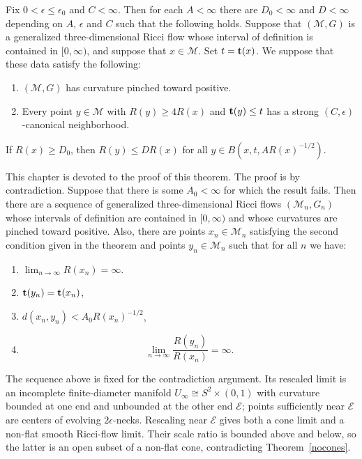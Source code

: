 \begin{theorem}
\label{thm:bounded-curvature-bounded-distance}
\label{bcbd}
Fix $0<\epsilon\le \epsilon_0$ and  $C<\infty$. Then for each
$A<\infty$ there are $D_0<\infty$ and $D<\infty$ depending on $A$,
$\epsilon$ and $C$ such that the following holds. Suppose that
$({\mathcal M},G)$ is a generalized three-dimensional Ricci flow
whose interval of definition is contained in $[0,\infty)$, and
suppose that $x\in {\mathcal M}$. Set $t={\bf t}(x)$. We suppose
that these data satisfy the following:
\begin{enumerate}
\item[(1)] $({\mathcal M},G)$ has curvature pinched toward positive.
\item[(2)] Every point $y\in{\mathcal  M}$ with
$R(y)\ge 4R(x)$  and ${\bf t}(y)\le t$ has a strong
$(C,\epsilon)$-canonical neighborhood.
\end{enumerate}
If $R(x)\ge D_0$, then $R(y)\le DR(x)$ for all $y\in
B(x,t,AR(x)^{-1/2})$.
\end{theorem}


This chapter is devoted to the proof of this theorem. The proof is
by contradiction. Suppose that there is some $A_0<\infty$ for which
the result fails. Then there are a sequence of generalized
three-dimensional Ricci flows $({\mathcal M}_n,G_n)$  whose
intervals of definition are contained in $[0,\infty)$ and whose
curvatures are pinched toward positive. Also, there are points
$x_n\in {\mathcal M}_n$ satisfying the second condition given in the
theorem and points $y_n\in {\mathcal M}_n$ such that for all $n$ we
have:
\begin{enumerate}
\item[(1)] $\lim_{n\rightarrow\infty}R(x_n)=\infty$.
\item[(2)] ${\bf t}(y_n)={\bf t}(x_n)$,
\item[(3)] $d(x_n,y_n)< A_0R(x_n)^{-1/2}$,
\item[(4)] $$\lim_{n\rightarrow\infty}\frac{R(y_n)}{R(x_n)}=\infty.$$
\end{enumerate}
The sequence above is fixed for the contradiction argument. Its
rescaled limit is an incomplete finite-diameter manifold
$U_\infty\cong S^2\times(0,1)$ with curvature bounded at one end and
unbounded at the other end ${\mathcal E}$; points sufficiently near
${\mathcal E}$ are centers of evolving $2\epsilon$-necks. Rescaling
near ${\mathcal E}$ gives both a cone limit and a non-flat smooth
Ricci-flow limit. Their scale ratio is bounded above and below, so
the latter is an open subset of a non-flat cone, contradicting
Theorem~\ref{nocones}.

